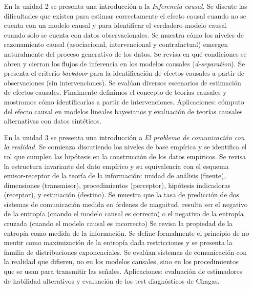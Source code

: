 \documentclass[a4paper,11pt]{book}
\theoremstyle{definition}
\begin{document}
En la unidad 2 se presenta una introducci\'on a la \emph{Inferencia causal}.
%
Se discute las dificultades que existen para estimar correctamente el efecto causal cuando no se cuenta con un modelo causal y para identificar el verdadero modelo causal cuando solo se cuenta con datos observacionales.
%
Se muestra c\'omo los niveles de razonamiento causal (asociacional, intervencional y contrafactual) emergen naturalmente del proceso generativo de los datos.
%
Se revisa en qu\'e condiciones se abren y cierran los flujos de inferencia en los modelos causales (\emph{d-separation}).
%
Se presenta el criterio \emph{backdoor} para la identificaci\'on de efectos causales a partir de observaciones (sin intervenciones).
%
Se eval\'uan diversos escenarios de estimaci\'on de efectos causales.
%
Finalmente definimos el concepto de teor\'ias causales y mostramos c\'omo identificarlas a partir de intervenciones.
%
Aplicaciones: c\'omputo del efecto causal en modelos lineales bayesianos y evaluaci\'on de teor\'ias causales alternativas con datos sint\'eticos.


En la unidad 3 se presenta una introducci\'on a \emph{El problema de comunicaci\'on con la realidad}.
%
Se comienza discutiendo los niveles de base emp\'irica y se identifica el rol que cumplen las hip\'otesis en la construcci\'on de los datos emp\'iricos.
%
Se revisa la estructura invariante del dato emp\'irico y su equivalencia con el esquema emisor-receptor de la teor\'ia de la informaci\'on: unidad de an\'alisis (fuente), dimensiones (transmisor), procedimientos (perceptor), hip\'otesis indicadoras (receptor), y estimaci\'on (destino).
%
Se muestra que la tasa de predicci\'on de dos sistemas de comunicaci\'on medida en \'ordenes de magnitud, resulta ser el negativo de la entrop\'ia (cuando el modelo causal es correcto) o el negativo de la entrop\'ia cruzada (cuando el modelo causal es incorrecto)
%
Se revisa la propiedad de la entrop\'ia como medida de la informaci\'on.
%
Se define formalmente el principio de no mentir como maximizaci\'on de la entrop\'ia dada restricciones y se presenta la familia de distribuciones exponenciales.
%
Se eval\'uan sistemas de comunicaci\'on con la realidad que difieren, no en los modelos causales, sino en los procedimientos que se usan para transmitir las se\~nales.
%
Aplicaciones: evaluaci\'on de estimadores de habilidad alterativos y evaluaci\'on de los test diagn\'osticos de Chagas.

\end{document}
